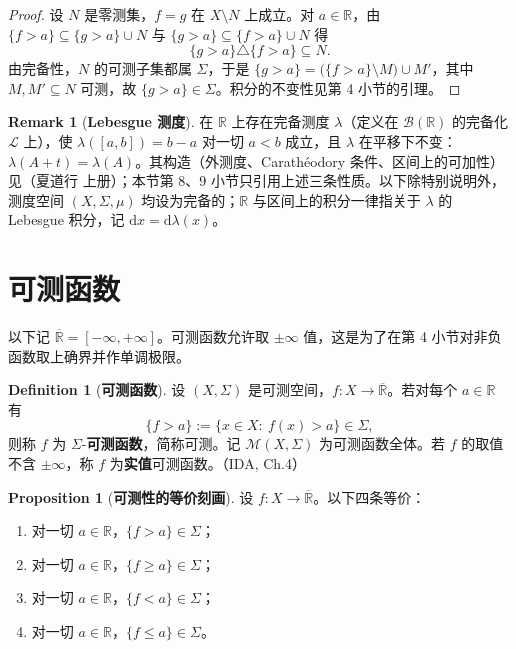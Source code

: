 \documentclass[oneside]{book}
\theoremstyle{definition}
\newcommand{\R}{\mathbb{R}}
\newcommand{\dd}{\mathrm{d}}
\theoremstyle{definition}
\newtheorem{proposition}{Proposition}[section]
\newtheorem{definition}{Definition}[section]
\newtheorem{remark}{Remark}[section]
\begin{document}
	\begin{proof}
		设 $N$ 是零测集，$f=g$ 在 $X\setminus N$ 上成立。对 $a\in\R$，由 $\{f>a\}\subseteq\{g>a\}\cup N$ 与 $\{g>a\}\subseteq\{f>a\}\cup N$ 得
		\[
		\{g>a\}\triangle\{f>a\}\subseteq N .
		\]
		由完备性，$N$ 的可测子集都属 $\Sigma$，于是 $\{g>a\}=\bigl(\{f>a\}\setminus M\bigr)\cup M'$，其中 $M,M'\subseteq N$ 可测，故 $\{g>a\}\in\Sigma$。积分的不变性见第 4 小节的引理。
	\end{proof}
	
	\begin{remark}[\bfseries{Lebesgue 测度}]
		在 $\R$ 上存在完备测度 $\lambda$（定义在 $\mathcal{B}(\R)$ 的完备化 $\mathcal{L}$ 上），使 $\lambda([a,b])=b-a$ 对一切 $a<b$ 成立，且 $\lambda$ 在平移下不变：$\lambda(A+t)=\lambda(A)$。其构造（外测度、Carathéodory 条件、区间上的可加性）见（夏道行 上册）；本节第 8、9 小节只引用上述三条性质。以下除特别说明外，测度空间 $(X,\Sigma,\mu)$ 均设为完备的；$\R$ 与区间上的积分一律指关于 $\lambda$ 的 Lebesgue 积分，记 $\dd x=\dd\lambda(x)$。
	\end{remark}
	
	\section{可测函数}
	
	以下记 $\overline{\R}=[-\infty,+\infty]$。可测函数允许取 $\pm\infty$ 值，这是为了在第 4 小节对非负函数取上确界并作单调极限。
	
	\begin{definition}[\bfseries{可测函数}]
		设 $(X,\Sigma)$ 是可测空间，$f:X\to\overline{\R}$。若对每个 $a\in\R$ 有
		\[
		\{f>a\}:=\{x\in X:\ f(x)>a\}\in\Sigma ,
		\]
		则称 $f$ 为 $\Sigma$-\textbf{可测函数}，简称可测。记 $\mathcal{M}(X,\Sigma)$ 为可测函数全体。若 $f$ 的取值不含 $\pm\infty$，称 $f$ 为\textbf{实值}可测函数。（IDA, Ch.4）
	\end{definition}
	
	\begin{proposition}[\bfseries{可测性的等价刻画}]
		设 $f:X\to\overline{\R}$。以下四条等价：
		\begin{enumerate}
			\item 对一切 $a\in\R$，$\{f>a\}\in\Sigma$；
			\item 对一切 $a\in\R$，$\{f\geqslant a\}\in\Sigma$；
			\item 对一切 $a\in\R$，$\{f<a\}\in\Sigma$；
			\item 对一切 $a\in\R$，$\{f\leqslant a\}\in\Sigma$。
		\end{enumerate}
	\end{proposition}
	
\end{document}

